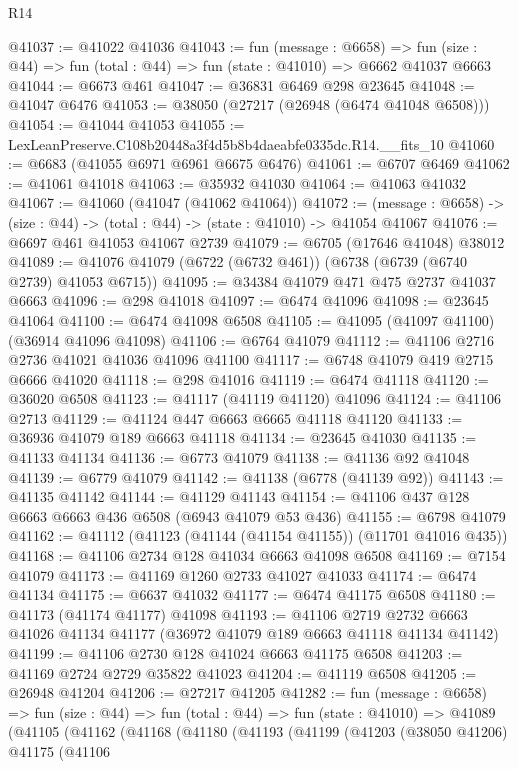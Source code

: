 \begin{lexlean}{R14}
\begin{coremodule}
@41037 := @41022 @41036
@41043 := fun (message : @6658) =>
  fun (size : @44) => fun (total : @44) => fun (state : @41010) => @6662 @41037 @6663
@41044 := @6673 @461
@41047 := @36831 @6469 @298 @23645
@41048 := @41047 @6476
@41053 := @38050 (@27217 (@26948 (@6474 @41048 @6508)))
@41054 := @41044 @41053
@41055 := LexLeanPreserve.C108b20448a3f4d5b8b4daeabfe0335dc.R14.__fits_10
@41060 := @6683 (@41055 @6971 @6961 @6675 @6476)
@41061 := @6707 @6469
@41062 := @41061 @41018
@41063 := @35932 @41030
@41064 := @41063 @41032
@41067 := @41060 (@41047 (@41062 @41064))
@41072 := (message : @6658) -> (size : @44) -> (total : @44) -> (state : @41010) -> @41054 @41067
@41076 := @6697 @461 @41053 @41067 @2739
@41079 := @6705 (@17646 @41048) @38012
@41089 := @41076 @41079 (@6722 (@6732 @461)) (@6738 (@6739 (@6740 @2739) @41053 @6715))
@41095 := @34384 @41079 @471 @475 @2737 @41037 @6663
@41096 := @298 @41018
@41097 := @6474 @41096
@41098 := @23645 @41064
@41100 := @6474 @41098 @6508
@41105 := @41095 (@41097 @41100) (@36914 @41096 @41098)
@41106 := @6764 @41079
@41112 := @41106 @2716 @2736 @41021 @41036 @41096 @41100
@41117 := @6748 @41079 @419 @2715 @6666 @41020
@41118 := @298 @41016
@41119 := @6474 @41118
@41120 := @36020 @6508
@41123 := @41117 (@41119 @41120) @41096
@41124 := @41106 @2713
@41129 := @41124 @447 @6663 @6665 @41118 @41120
@41133 := @36936 @41079 @189 @6663 @41118
@41134 := @23645 @41030
@41135 := @41133 @41134
@41136 := @6773 @41079
@41138 := @41136 @92 @41048
@41139 := @6779 @41079
@41142 := @41138 (@6778 (@41139 @92))
@41143 := @41135 @41142
@41144 := @41129 @41143
@41154 := @41106 @437 @128 @6663 @6663 @436 @6508 (@6943 @41079 @53 @436)
@41155 := @6798 @41079
@41162 := @41112 (@41123 (@41144 (@41154 @41155)) (@11701 @41016 @435))
@41168 := @41106 @2734 @128 @41034 @6663 @41098 @6508
@41169 := @7154 @41079
@41173 := @41169 @1260 @2733 @41027 @41033
@41174 := @6474 @41134
@41175 := @6637 @41032
@41177 := @6474 @41175 @6508
@41180 := @41173 (@41174 @41177) @41098
@41193 := @41106
    @2719
    @2732
    @6663
    @41026
    @41134
    @41177
    (@36972 @41079 @189 @6663 @41118 @41134 @41142)
@41199 := @41106 @2730 @128 @41024 @6663 @41175 @6508
@41203 := @41169 @2724 @2729 @35822 @41023
@41204 := @41119 @6508
@41205 := @26948 @41204
@41206 := @27217 @41205
@41282 := fun (message : @6658) =>
  fun (size : @44) =>
  fun (total : @44) =>
  fun (state : @41010) =>
  @41089
    (@41105
      (@41162
        (@41168
          (@41180
            (@41193
              (@41199
                (@41203
                  (@38050 @41206)
                  @41175
                  (@41106

\end{coremodule}
\end{lexlean}
